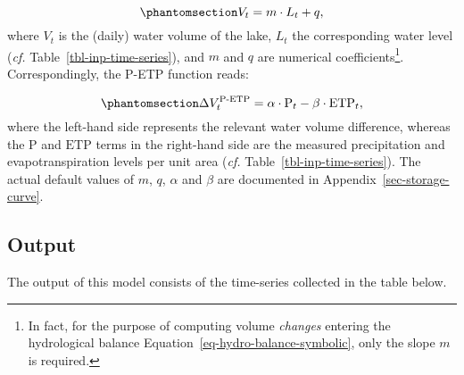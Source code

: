 \documentclass[
  letterpaper,
  DIV=11,
  numbers=noendperiod]{scrreprt}
\begin{document}
\begin{equation}\phantomsection\label{eq-storage-function}{
V_t = m \cdot L_t + q,
}\end{equation} where \(V_t\) is the (daily) water volume of the lake,
\(L_t\) the corresponding water level (\emph{cf.}
Table~\ref{tbl-inp-time-series}), and \(m\) and \(q\) are numerical
coefficients\footnote{In fact, for the purpose of computing volume
  \emph{changes} entering the hydrological balance
  Equation~\ref{eq-hydro-balance-symbolic}, only the slope \(m\) is
  required.}. Correspondingly, the P-ETP function reads:

\begin{equation}\phantomsection\label{eq-petp-function}{
\Delta V_t ^{\text{P-ETP}} = \alpha \cdot \text{P}_t - \beta\cdot \text{ETP}_t,
}\end{equation} where the left-hand side represents the relevant water
volume difference, whereas the \(\text{P}\) and \(\text{ETP}\) terms in
the right-hand side are the measured precipitation and
evapotranspiration levels per unit area (\emph{cf.}
Table~\ref{tbl-inp-time-series}). The actual default values of \(m\),
\(q\), \(\alpha\) and \(\beta\) are documented in
Appendix~\ref{sec-storage-curve}.

\subsection{Output}\label{output-1}

The output of this model consists of the time-series collected in the
table below.
\end{document}
